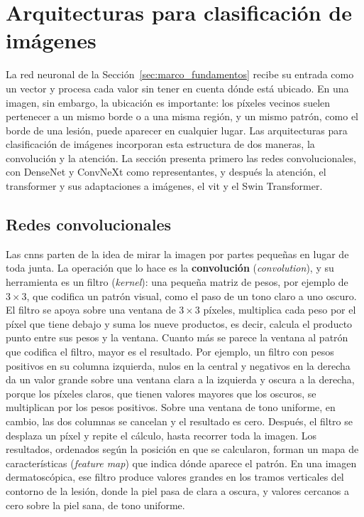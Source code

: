 \section{Arquitecturas para clasificación de imágenes}
\label{sec:marco_vision}

La red neuronal de la Sección~\ref{sec:marco_fundamentos} recibe su entrada como un vector y procesa cada valor
sin tener en cuenta dónde está ubicado. En una imagen, sin embargo, la ubicación es importante: los píxeles vecinos
suelen pertenecer a un mismo borde o a una misma región, y un mismo patrón, como el borde de una lesión, puede
aparecer en cualquier lugar. Las arquitecturas para clasificación de imágenes incorporan esta estructura de dos
maneras, la convolución y la atención. La sección presenta primero las redes convolucionales, con DenseNet y
ConvNeXt como representantes, y después la atención, el transformer y sus adaptaciones a imágenes, el \gls{vit} y
el Swin Transformer.

\subsection{Redes convolucionales}
\label{sec:marco_cnn}

Las \glspl{cnn} parten de la idea de mirar la imagen por partes pequeñas en lugar de toda junta. La operación
que lo hace es la \textbf{convolución} (\emph{convolution}), y su herramienta es un filtro (\emph{kernel}): una
pequeña matriz de pesos, por ejemplo de $3 \times 3$, que codifica un patrón visual, como el paso de un tono
claro a uno oscuro. El filtro se apoya sobre una ventana de $3 \times 3$ píxeles, multiplica cada peso por el
píxel que tiene debajo y suma los nueve productos, es decir, calcula el producto punto entre sus pesos y la
ventana. Cuanto más se parece la ventana al patrón que codifica el filtro, mayor es el resultado. Por ejemplo,
un filtro con pesos positivos en su columna izquierda, nulos en la central y negativos en la derecha da un valor
grande sobre una ventana clara a la izquierda y oscura a la derecha, porque los píxeles claros, que tienen
valores mayores que los oscuros, se multiplican por los pesos positivos. Sobre una ventana de tono uniforme, en
cambio, las dos columnas se cancelan y el resultado es cero. Después, el filtro se desplaza un píxel y repite el cálculo, hasta recorrer toda la imagen. Los resultados, ordenados según la
posición en que se calcularon, forman un mapa de características (\emph{feature map}) que indica dónde aparece
el patrón. En una imagen dermatoscópica, ese filtro produce valores grandes en los tramos verticales del contorno
de la lesión, donde la piel pasa de clara a oscura, y valores cercanos a cero sobre la piel sana, de tono
uniforme.

